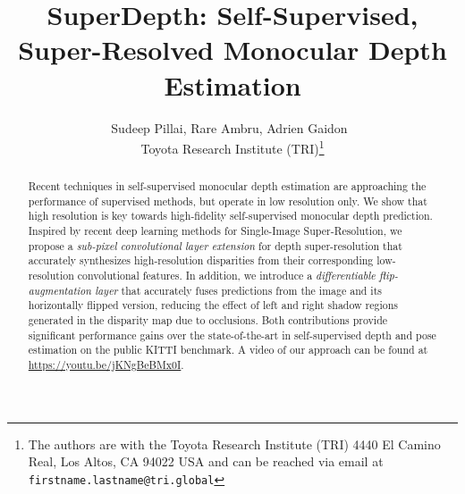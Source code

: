 \documentclass[letterpaper, 10 pt, conference]{ieeeconf}  \IEEEoverridecommandlockouts
\newcommand{\PAPERAUTHORS}{Sudeep Pillai, Rare\cb{s} Ambru\cb{s}, Adrien Gaidon}
\newcommand{\PAPERTITLE}{SuperDepth: Self-Supervised, Super-Resolved Monocular Depth Estimation}
\begin{document}
\title{\LARGE \PAPERTITLE\vspace{-2ex}}
\author{\PAPERAUTHORS{}~\\
Toyota Research Institute (TRI)\thanks{The authors are with the Toyota Research Institute (TRI) 4440 El Camino Real, Los Altos, CA 94022 USA and can be reached via email at {\tt\small firstname.lastname@tri.global}}}

\maketitle\vspace{-6mm}
\thispagestyle{empty}
\pagestyle{empty}

\begin{abstract}
Recent techniques in self-supervised monocular depth estimation
are approaching the performance of supervised methods, but operate in low resolution only. We show that high resolution is key towards high-fidelity self-supervised monocular depth prediction.
Inspired by recent deep learning methods for Single-Image Super-Resolution, we propose a \textit{sub-pixel convolutional layer extension} for depth super-resolution that accurately synthesizes high-resolution disparities from their corresponding low-resolution convolutional features.
In addition, we introduce a \textit{differentiable flip-augmentation layer} that accurately fuses predictions from the image and its horizontally flipped version, reducing the effect of left and right shadow regions generated in the disparity map due to occlusions.
Both contributions provide significant performance gains over the state-of-the-art in self-supervised depth and pose estimation on the public KITTI benchmark. A video of our approach can be found at \href{https://youtu.be/jKNgBeBMx0I}{https://youtu.be/jKNgBeBMx0I}.





 \end{abstract}

\IEEEpeerreviewmaketitle
\end{document}
